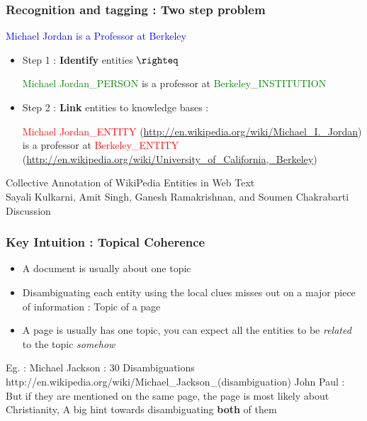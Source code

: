 \documentclass{beamer}
\begin{document}
\begin{frame}
 \frametitle{Recognition and tagging : Two step problem}
 \begin{center}
\textcolor{blue}{Michael Jordan is a Professor at Berkeley}
   \end{center}

 \begin{itemize}  
  \item Step 1 : \textbf{Identify} entities $\righteq$ 
  \medskip
  
  \textcolor{green}{Michael Jordan\_PERSON} is a professor at \textcolor{green}{Berkeley\_INSTITUTION} \medskip
  \item Step 2 : \textbf{Link} entities to knowledge bases : 
  \medskip
  
  \textcolor{red}{Michael Jordan\_ENTITY} (\url{http://en.wikipedia.org/wiki/Michael_I._Jordan})  is a professor at  
  \textcolor{red}{Berkeley\_ENTITY} (\url{http://en.wikipedia.org/wiki/University_of_California,_Berkeley})
\end{itemize}

\end{frame}

\begin{frame}
 \begin{center}
  Collective Annotation of WikiPedia Entities in Web Text \\ Sayali Kulkarni, Amit Singh, Ganesh Ramakrishnan, and Soumen Chakrabarti
  \\Discussion
 \end{center}

\end{frame}

\begin{frame}
 \frametitle{Key Intuition : Topical Coherence}
 \begin{itemize}
  \item A document is usually about one topic \bigskip
  \item Disambiguating each entity using the local clues misses out on a major piece of information : Topic of a page \bigskip
  \item A page is usually has one topic, you can expect all the entities to be \emph{related} to the topic \emph{somehow} \bigskip
  \end{itemize}
Eg. : Michael Jackson : 30 Disambiguations http://en.wikipedia.org/wiki/Michael\_Jackson\_(disambiguation)
  John Paul : 
  But if they are mentioned on the same page, the page is most likely about Christianity, A big hint towards disambiguating \textbf{both} of them
  
 
  \end{frame}
 
\end{document}
